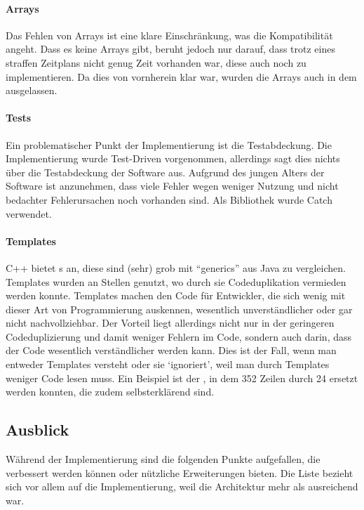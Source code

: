     \paragraph{Arrays}
    Das Fehlen von Arrays ist eine klare Einschränkung, was die Kompatibilität angeht. Dass es keine Arrays gibt, beruht jedoch nur darauf, dass trotz eines straffen Zeitplans nicht genug Zeit vorhanden war, diese auch noch zu implementieren. Da dies von vornherein klar war, wurden die Arrays auch in dem  ausgelassen.

    \paragraph{Tests}
    Ein problematischer Punkt der Implementierung ist die Testabdeckung. Die Implementierung wurde Test-Driven vorgenommen, allerdings sagt dies nichts über die Testabdeckung der Software aus. Aufgrund des jungen Alters der Software ist anzunehmen, dass viele Fehler wegen weniger Nutzung und nicht bedachter Fehlerursachen noch vorhanden sind. Als Bibliothek wurde Catch \autocite{catch-lib} verwendet.

    \paragraph{Templates}
    C++ bietet s an, diese sind (sehr) grob mit ``generics'' aus Java zu vergleichen. Templates wurden an Stellen genutzt, wo durch sie Codeduplikation vermieden werden konnte. Templates machen den Code für Entwickler, die sich wenig mit dieser Art von Programmierung auskennen, wesentlich unverständlicher oder gar nicht nachvollziehbar. Der Vorteil liegt allerdings nicht nur in der geringeren Codeduplizierung und damit weniger Fehlern im Code, sondern auch darin, dass der Code wesentlich verständlicher werden kann. Dies ist der Fall, wenn man entweder Templates versteht oder sie `ignoriert', weil man durch Templates weniger Code lesen muss. Ein Beispiel ist der , in dem 352 Zeilen durch 24 ersetzt werden konnten, die zudem selbsterklärend sind.

  \subsection{Ausblick}
  \label{ssec:Ausblick}
    Während der Implementierung sind die folgenden Punkte aufgefallen, die verbessert werden können oder nützliche Erweiterungen bieten. Die Liste bezieht sich vor allem auf die Implementierung, weil die Architektur mehr als ausreichend war.

